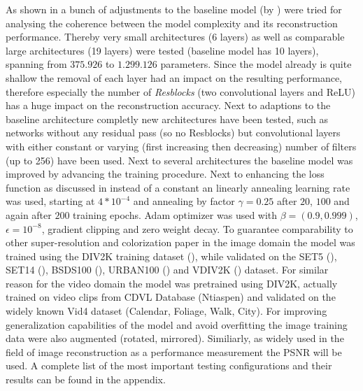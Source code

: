 As shown in  a bunch of adjustments to the
baseline model (by \cite{TAID}) were tried for analysing the coherence between
the model complexity and its reconstruction performance. Thereby very small
architectures (6 layers) as well as comparable large architectures
(19 layers) were tested (baseline model has 10 layers), spanning
from $375.926$ to $1.299.126$ parameters. Since the model already is quite
shallow the removal of each layer had an impact on the resulting performance,
therefore especially the number of \textit{Resblocks} (two convolutional layers
and ReLU) has a huge impact on the reconstruction accuracy. Next to adaptions
to the baseline architecture completly new architectures have been tested, such
as networks without any residual pass (so no Resblocks) but convolutional layers
with either constant or varying (first increasing then decreasing) number of
filters (up to 256) have been used.
\newline
Next to several architectures the baseline model was improved by advancing the
training procedure. Next to enhancing the loss function as discussed in
 instead of a constant an linearly annealing learning
rate was used, starting at $4*10^{-4}$ and annealing by factor $\gamma = 0.25$
after $20$, $100$ and again after $200$ training epochs. Adam optimizer was used
with $\beta = (0.9, 0.999)$, $\epsilon = 10^{-8}$, gradient clipping and  zero
weight decay.
\newline
To guarantee comparability to other super-resolution and colorization paper
in the image domain the model was trained using the DIV2K training dataset
(\cite{DIV2K}), while validated on the SET5 (\cite{SET5}), SET14 (\cite{SET14}),
BSDS100 (\cite{BSDS100}), URBAN100 (\cite{URBAN100}) and VDIV2K (\cite{DIV2K})
dataset. For similar reason for the video domain the model was pretrained using
DIV2K, actually trained on video clips from CDVL Database (Ntiaspen) and
validated on the widely known Vid4 dataset (Calendar, Foliage, Walk, City).
For improving generalization capabilities of the model and avoid overfitting
the image training data were also augmented (rotated, mirrored).
\newline
Similiarly, as widely used in the field of image reconstruction as a performance
measurement the \ac{PSNR} will be used.
\newline
A complete list of the most important testing configurations and their results
can be found in the appendix.


